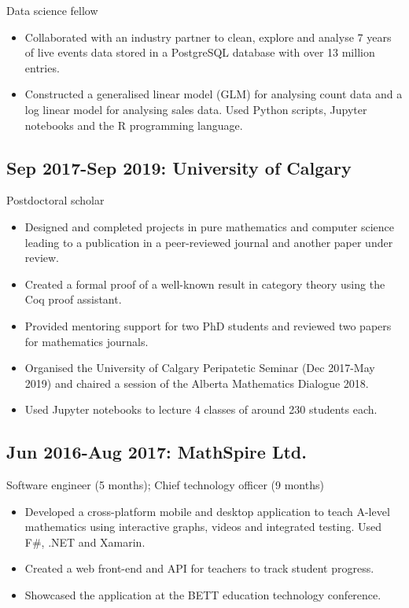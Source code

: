 \documentclass[11pt]{article}
\begin{document}
Data science fellow

\begin{itemize}
\item Collaborated with an industry partner to clean, explore and analyse 7 years of live events data stored in a PostgreSQL database with over 13 million entries.
\item Constructed a generalised linear model (GLM) for analysing count data and a log linear model for analysing sales data. Used Python scripts, Jupyter notebooks and the R programming language.
\end{itemize}

\subsection*{Sep 2017-Sep 2019: University of Calgary}

Postdoctoral scholar

\begin{itemize}
\item Designed and completed projects in pure mathematics and computer science leading to a publication in a peer-reviewed journal and another paper under review.
\item Created a formal proof of a well-known result in category theory using the Coq proof assistant.
\item Provided mentoring support for two PhD students and reviewed two papers for mathematics journals.
\item Organised the University of Calgary Peripatetic Seminar (Dec 2017-May 2019) and chaired a session of the Alberta Mathematics Dialogue 2018.
\item Used Jupyter notebooks to lecture 4 classes of around 230 students each.
\end{itemize}

\subsection*{Jun 2016-Aug 2017: MathSpire Ltd.}

Software engineer (5 months); Chief technology officer (9 months)

\begin{itemize}
\item Developed a cross-platform mobile and desktop application to teach A-level mathematics using interactive graphs, videos and integrated testing. Used F\#, .NET and Xamarin.
\item Created a web front-end and API for teachers to track student progress.
\item Showcased the application at the BETT education technology conference.
\end{itemize}
\end{document}
